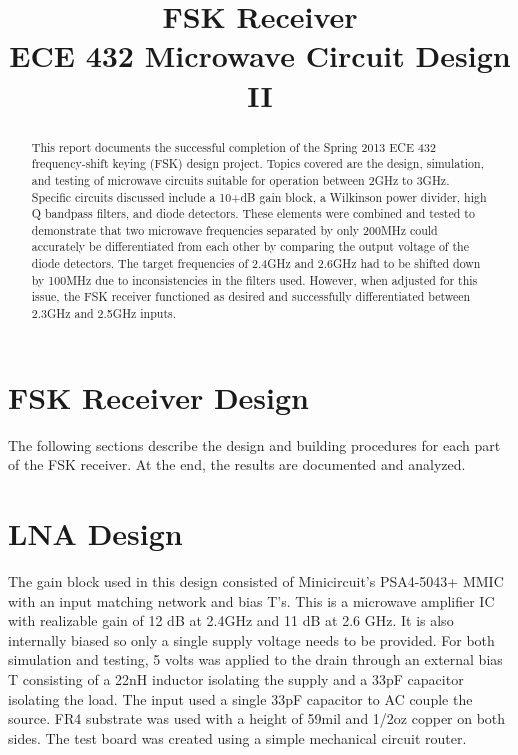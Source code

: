 \documentclass[conference]{IEEEtran}
\begin{document}
\title{FSK Receiver\\ECE 432 Microwave Circuit Design II}
\author{
}
\maketitle
\IEEEpeerreviewmaketitle
\begin{abstract}
This report documents the successful completion of the Spring 2013 ECE 432 frequency-shift keying (FSK) design project. Topics covered are the design, simulation, and testing of microwave circuits suitable for operation between 2GHz to 3GHz. Specific circuits discussed include a 10+dB gain block, a Wilkinson power divider, high Q bandpass filters, and diode detectors. These elements were combined and tested to demonstrate that two microwave frequencies separated by only 200MHz could accurately be differentiated from each other by comparing the output voltage of the diode detectors. The target frequencies of 2.4GHz and 2.6GHz had to be shifted down by 100MHz due to inconsistencies in the filters used. However, when adjusted for this issue, the FSK receiver functioned as desired and successfully differentiated between 2.3GHz and 2.5GHz inputs.
\end{abstract}
\section{FSK Receiver Design}
The following sections describe the design and building procedures for each part of the FSK receiver. At the end, the results are documented and analyzed.


\section{LNA Design}
The gain block used in this design consisted of Minicircuit's PSA4-5043+ MMIC with an input matching network and bias T's. This is a microwave amplifier IC with realizable gain of 12 dB at 2.4GHz and 11 dB at 2.6 GHz. It is also internally biased so only a single supply voltage needs to be provided. For both simulation and testing, 5 volts was applied to the drain through an external bias T consisting of a 22nH inductor isolating the supply and a 33pF capacitor isolating the load. The input used a single 33pF capacitor to AC couple the source. FR4 substrate was used with a height of 59mil and 1/2oz copper on both sides. The test board was created using a simple mechanical circuit router. 
\end{document}
